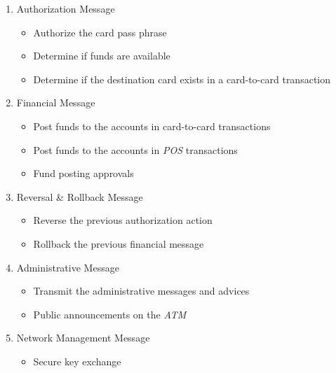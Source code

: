 \documentclass[12pt]{article}
\numberwithin{equation}{section}
\numberwithin{table}{section}
\numberwithin{figure}{section}
\begin{document}
\begin{enumerate}
	\item{Authorization Message}
		\begin{itemize}
			\item{Authorize the card pass phrase}
			\item{Determine if funds are available}
			\item{Determine if the destination card exists in a card-to-card transaction}
		\end{itemize}
		
	\item{Financial Message}
		\begin{itemize}
			\item{Post funds to the accounts in card-to-card transactions}
			\item{Post funds to the accounts in \textit{POS} transactions}
			\item{Fund posting approvals}
		\end{itemize}
	
	\item{Reversal \& Rollback Message}
		\begin{itemize}
			\item{Reverse the previous authorization action}
			\item{Rollback the previous financial message}
		\end{itemize}
		
	\item{Administrative Message}
		\begin{itemize}
			\item{Transmit the administrative messages and advices}
			\item{Public announcements on the \textit{ATM}}
		\end{itemize}
		
	\item{Network Management Message}
		\begin{itemize}
			\item{Secure key exchange}
		\end{itemize}
	
\end{enumerate}
\end{document}

